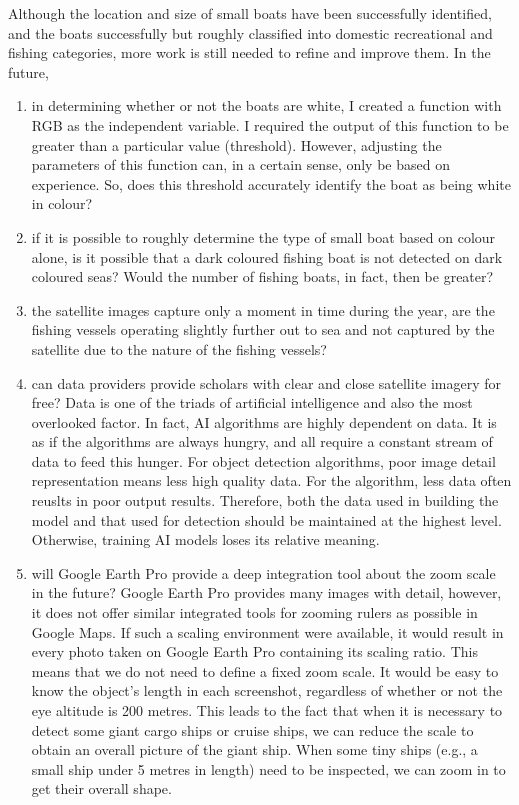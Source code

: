 Although the location and size of small boats have been successfully identified, and the boats successfully but roughly classified into domestic recreational and fishing categories, more work is still needed to refine and improve them. In the future,

\begin{enumerate}
    
    \item in determining whether or not the boats are white, I created a function with RGB as the independent variable. I required the output of this function to be greater than a particular value (threshold). However, adjusting the parameters of this function can, in a certain sense, only be based on experience. So, does this threshold accurately identify the boat as being white in colour?
    
    \item if it is possible to roughly determine the type of small boat based on colour alone, is it possible that a dark coloured fishing boat is not detected on dark coloured seas? Would the number of fishing boats, in fact, then be greater?
    
    \item the satellite images capture only a moment in time during the year, are the fishing vessels operating slightly further out to sea and not captured by the satellite due to the nature of the fishing vessels?


    \item can data providers provide scholars with clear and close satellite imagery for free? Data is one of the triads of artificial intelligence and also the most overlooked factor. In fact, AI algorithms are highly dependent on data. It is as if the algorithms are always hungry, and all require a constant stream of data to feed this hunger. For object detection algorithms, poor image detail representation means less high quality data. For the algorithm, less data often reuslts in poor output results. Therefore, both the data used in building the model and that used for detection should be maintained at the highest level. Otherwise, training AI models loses its relative meaning.
    
    \item will Google Earth Pro provide a deep integration tool about the zoom scale in the future? Google Earth Pro provides many images with detail, however, it does not offer similar integrated tools for zooming rulers as possible in Google Maps. If such a scaling environment were available, it would result in every photo taken on Google Earth Pro containing its scaling ratio. This means that we do not need to define a fixed zoom scale. It would be easy to know the object's length in each screenshot, regardless of whether or not the eye altitude is 200 metres. This leads to the fact that when it is necessary to detect some giant cargo ships or cruise ships, we can reduce the scale to obtain an overall picture of the giant ship. When some tiny ships (e.g., a small ship under 5 metres in length) need to be inspected, we can zoom in to get their overall shape.
    

\end{enumerate}
